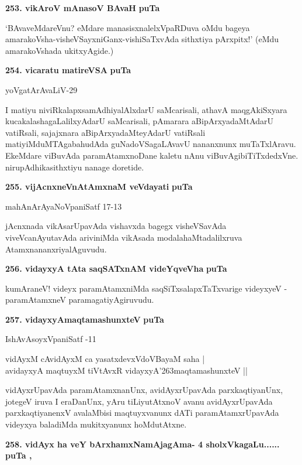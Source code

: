 \medskip
\noindent
\textbf{253. vikAroV mAnasoV BAvaH} \hfill{\bf puTa \pageref{230}}

\smallskip
`BAvaveMdareVnu? eMdare manasisxnalelxVpaRDuva oMdu bageya amarakoVsha-visheVSayxniGanx-vishiSaTxvAda sithxtiya pArxpitx!' \-(eMdu amarakoVshada ukitxyAgide.)

\medskip
\noindent
\textbf{254. vicaratu matireVSA} \hfill{\bf puTa \pageref{257}}

\hfill{yoVgatArAvaLiV-29}

\smallskip
I matiyu niviRkalapxsamAdhiyalAlxdarU saMcarisali, athavA maqgA\-kiSxyara kucakalashagaLalilxyA\-darU saMcarisali, pAmarara aBipArxyadaMtAdarU vatiR\-sali, sajajxnara aBipArxyadaMteyAdarU vatiRsali matiyiMduMTAgabahudAda guNa\-doVSagaLAvavU nananxnunx muTaTxlAravu. EkeMdare viBuvAda paramAtamxnoDane kaletu nAnu viBuvAgibiTiTxdedxVne. nirupAdhikasithxtiyu nanage doretide.

\medskip
\noindent
\textbf{255. vijAcnxneVnAtAmxnaM veVdayati} \hfill{\bf puTa \pageref{21}}

\hfill{mahAnArAyaNoVpaniSatf 17-13}

\smallskip
jAcnxnada vikAsarUpavAda vishavxda bagegx visheVSavAda viveVcanAyutavAda ariviniMda vikAsada modalahaMtadalilxruva AtamxnananxriyalAguvudu.

\medskip
\noindent
\textbf{256. vidayxyA tAta saqSATxnAM videYqveVha} \hfill{\bf puTa \pageref{86}}

\smallskip
kumAraneV! videyx paramAtamxniMda saqSiTxsalapxTaTxvarige videyxyeV - paramAtamxneV paramagatiyAgiruvudu.

\medskip
\noindent
\textbf{257. vidayxyAmaqtamashunxteV} \hfill{\bf puTa \pageref{86}}

\hfill{IshAvAsoyxVpaniSatf -11}

\begin{shloka}
vidAyxM cAvidAyxM ca yasatxdevxVdoVBayaM saha |\\
avidayxyA maqtuyxM tiVtAvxR vidayxyA\char'263maqtamashunxteV ||
\end{shloka}

\smallskip
vidAyxrUpavAda paramAtamxnanUnx, avidAyxrUpavAda parxkaqtiyanUnx, jotegeV iruva I era\-Da\-nUnx, yAru tiLiyutAtxnoV avanu avidAyxrUpavAda parxkaqti\-yanenxV avalaMbisi maqtuyxvanunx dATi para\-mAtamx\-rUpavAda videyxya baladiMda mukitxyanunx hoMdutAtxne.

\medskip
\noindent
\textbf{258. vidAyx ha veY bArxhamxNamAjagAma- 4 sholxVkagaLu......} \hfill{\bf puTa \pageref{48}, \pageref{85}}

